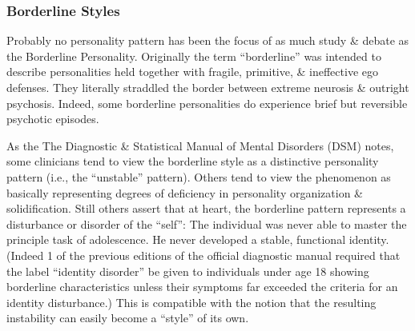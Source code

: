 \documentclass{article}
\numberwithin{equation}{section}
\begin{document}
\subsubsection{Borderline Styles}
Probably no personality pattern has been the focus of as much study \& debate as the Borderline Personality. Originally the term ``borderline'' was intended to describe personalities held together with fragile, primitive, \& ineffective ego defenses. They literally straddled the border between extreme neurosis \& outright psychosis. Indeed, some borderline personalities do experience brief but reversible psychotic episodes.

As the The Diagnostic \& Statistical Manual of Mental Disorders (DSM) notes, some clinicians tend to view the borderline style as a distinctive personality pattern (i.e., the ``unstable'' pattern). Others tend to view the phenomenon as basically representing degrees of deficiency in personality organization \& solidification. Still others assert that at heart, the borderline pattern represents a disturbance or disorder of the ``self'': The individual was never able to master the principle task of adolescence. He never developed a stable, functional identity. (Indeed 1 of the previous editions of the official diagnostic manual required that the label ``identity disorder'' be given to individuals under age 18 showing borderline characteristics unless their symptoms far exceeded the criteria for an identity disturbance.) This is compatible with the notion that the resulting instability can easily become a ``style'' of its own.
\end{document}
